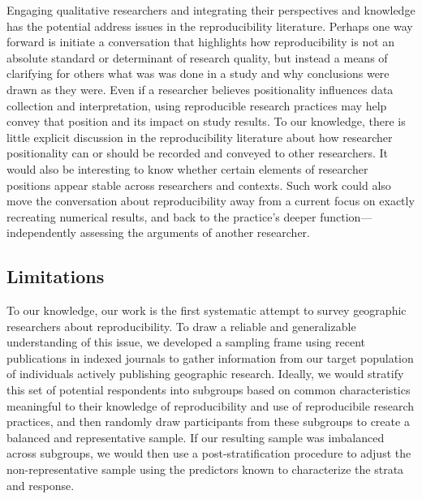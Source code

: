 \documentclass[]{interact}
\theoremstyle{plain}%
\theoremstyle{definition}
\theoremstyle{remark}
\begin{document}
Engaging qualitative researchers and integrating their perspectives and knowledge has the potential address issues in the reproducibility literature.  
Perhaps one way forward is initiate a conversation that highlights how reproducibility is not an absolute standard or determinant of research quality, but instead a means of clarifying for others what was was done in a study and why conclusions were drawn as they were.
Even if a researcher believes positionality influences data collection and interpretation, using reproducible research practices may help convey that position and its impact on study results.
To our knowledge, there is little explicit discussion in the reproducibility literature about how researcher positionality can or should be recorded and conveyed to other researchers. 
It would also be interesting to know whether certain elements of researcher positions appear stable across researchers and contexts.
Such work could also move the conversation about reproducibility away from a current focus on exactly recreating numerical results, and back to the practice's deeper function---independently assessing the arguments of another researcher. 

\subsection*{Limitations}
To our knowledge, our work is the first systematic attempt to survey geographic researchers about reproducibility. 
To draw a reliable and generalizable understanding of this issue, we developed a sampling frame using recent publications in indexed journals to gather information from our target population of individuals actively publishing geographic research. 
Ideally, we would stratify this set of potential respondents into subgroups based on common characteristics meaningful to their knowledge of reproducibility and use of reproducibile research practices, and then randomly draw participants from these subgroups to create a balanced and representative sample. 
If our resulting sample was imbalanced across subgroups, we would then use a post-stratification procedure to adjust the non-representative sample using the predictors known to characterize the strata and response.   
\end{document}
